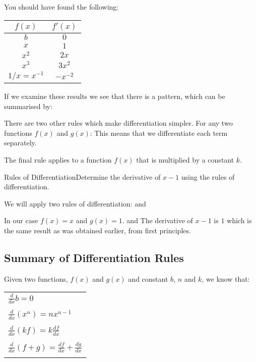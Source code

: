 You should have found the following:

\begin{center}
\begin{tabular}{|c|c|}\hline
$f(x)$&$f'(x)$\\\hline\hline
$b$&$0$\\\hline
$x$&$1$\\\hline
$x^2$&$2x$\\\hline
$x^3$&$3x^2$\\\hline
$1/x=x^{-1}$&$-x^{-2}$\\\hline
\end{tabular}
\end{center}

If we examine these results we see that there is a pattern, which can be summarised by:

There are two other rules which make differentiation simpler. For any two functions $f(x)$ and $g(x)$:
This means that we differentiate each term separately. 

The final rule applies to a function $f(x)$ that is multiplied by a constant $k$.


\begin{wex}{Rules of Differentiation}{Determine the derivative of $x-1$ using the rules of differentiation.}{
We will apply two rules of differentiation:
and

In our case $f(x)=x$ and $g(x)=1$.
and
The derivative of $x-1$ is $1$ which is the same result as was obtained earlier, from first principles.
}
\end{wex}

\subsection{Summary of Differentiation Rules}
\label{md:summ}

Given two functions, $f(x)$ and $g(x)$ and constant $b$, $n$ and $k$, we know that:
\begin{center}
\begin{tabular}{l}
$\frac{d}{dx} b = 0$\\
\\
$\frac{d}{dx} (x^n) = nx^{n-1}$\\
\\
$\frac{d}{dx} (kf) = k\frac{df}{dx}$\\
\\
$\frac{d}{dx} (f+g)= \frac{df}{dx}+\frac{dg}{dx}$\\
\\
\end{tabular}
\end{center}


